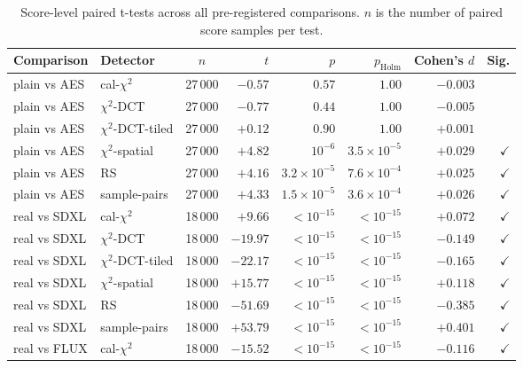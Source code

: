 \documentclass[10pt,twocolumn,a4paper]{article}
\begin{document}
\begin{table}[!htbp]
\centering\footnotesize
\caption{Score-level paired t-tests across all pre-registered comparisons. $n$ is the number of paired score samples per test.}
\label{tab:appendix-ttest}
\setlength{\tabcolsep}{4pt}\renewcommand{\arraystretch}{1.1}
\begin{tabular}{@{}l l c r r r r r@{}}
\toprule
\textbf{Comparison} & \textbf{Detector} & \textbf{$n$} & \textbf{$t$} & \textbf{$p$} & \textbf{$p_\text{Holm}$} & \textbf{Cohen's $d$} & \textbf{Sig.} \\
\midrule
plain vs AES   & cal-$\chi^2$       & 27\,000 & $-0.57$ & $0.57$ & $1.00$ & $-0.003$ & \\
plain vs AES   & $\chi^2$-DCT       & 27\,000 & $-0.77$ & $0.44$ & $1.00$ & $-0.005$ & \\
plain vs AES   & $\chi^2$-DCT-tiled & 27\,000 & $+0.12$ & $0.90$ & $1.00$ & $+0.001$ & \\
plain vs AES   & $\chi^2$-spatial   & 27\,000 & $+4.82$ & $10^{-6}$  & $3.5\!\times\!10^{-5}$ & $+0.029$ & $\checkmark$ \\
plain vs AES   & RS                 & 27\,000 & $+4.16$ & $3.2\!\times\!10^{-5}$ & $7.6\!\times\!10^{-4}$ & $+0.025$ & $\checkmark$ \\
plain vs AES   & sample-pairs       & 27\,000 & $+4.33$ & $1.5\!\times\!10^{-5}$ & $3.6\!\times\!10^{-4}$ & $+0.026$ & $\checkmark$ \\
\midrule
real vs SDXL   & cal-$\chi^2$       & 18\,000 & $+9.66$  & $<\!10^{-15}$ & $<\!10^{-15}$ & $+0.072$ & $\checkmark$ \\
real vs SDXL   & $\chi^2$-DCT       & 18\,000 & $-19.97$ & $<\!10^{-15}$ & $<\!10^{-15}$ & $-0.149$ & $\checkmark$ \\
real vs SDXL   & $\chi^2$-DCT-tiled & 18\,000 & $-22.17$ & $<\!10^{-15}$ & $<\!10^{-15}$ & $-0.165$ & $\checkmark$ \\
real vs SDXL   & $\chi^2$-spatial   & 18\,000 & $+15.77$ & $<\!10^{-15}$ & $<\!10^{-15}$ & $+0.118$ & $\checkmark$ \\
real vs SDXL   & RS                 & 18\,000 & $-51.69$ & $<\!10^{-15}$ & $<\!10^{-15}$ & $-0.385$ & $\checkmark$ \\
real vs SDXL   & sample-pairs       & 18\,000 & $+53.79$ & $<\!10^{-15}$ & $<\!10^{-15}$ & $+0.401$ & $\checkmark$ \\
\midrule
real vs FLUX   & cal-$\chi^2$       & 18\,000 & $-15.52$ & $<\!10^{-15}$ & $<\!10^{-15}$ & $-0.116$ & $\checkmark$ \\

\end{tabular}
\end{table}
\end{document}

